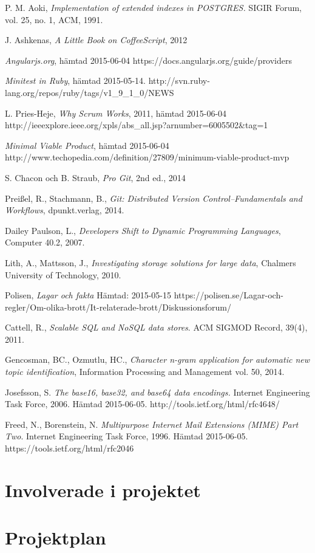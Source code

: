 \documentclass[a4paper,12pt,oneside,final]{extbook}
\begin{document}
\begin{thebibliography}{99}
  P. M. Aoki, \emph{Implementation of extended indexes in POSTGRES.} SIGIR Forum, vol. 25, no. 1, ACM, 1991.

  J. Ashkenas, \emph{A Little Book on CoffeeScript}, 2012

    \emph{Angularjs.org}, hämtad 2015-06-04
    \newline https://docs.angularjs.org/guide/providers

  \emph{Minitest in Ruby}, hämtad 2015-05-14.
  \newline http://svn.ruby-lang.org/repos/ruby/tags/v1\_9\_1\_0/NEWS

  L. Pries-Heje, \emph{Why Scrum Works}, 2011, hämtad 2015-06-04
  \newline http://ieeexplore.ieee.org/xpls/abs\_all.jsp?arnumber=6005502\&tag=1

  \emph{Minimal Viable Product}, hämtad 2015-06-04
  \newline http://www.techopedia.com/definition/27809/minimum-viable-product-mvp

  S. Chacon och B. Straub, \emph{Pro Git}, 2nd ed., 2014

  Preißel, R., Stachmann, B., \emph{Git: Distributed Version Control--Fundamentals and Workflows}, dpunkt.verlag, 2014.

  Dailey Paulson, L., \emph{Developers Shift to Dynamic Programming Languages}, Computer 40.2, 2007.

  Lith, A., Mattsson, J., \emph{Investigating storage solutions for large data}, Chalmers University of Technology, 2010.

  Polisen, \emph{Lagar och fakta} Hämtad: 2015-05-15
  \newline https://polisen.se/Lagar-och-regler/Om-olika-brott/It-relaterade-brott/Diskussionsforum/

  Cattell, R., \emph{Scalable SQL and NoSQL data stores}. ACM SIGMOD Record, 39(4), 2011.

  Gencosman, BC., Ozmutlu, HC., \emph{Character n-gram application for automatic new topic identification},
  Information Processing and Management vol. 50, 2014.

  Josefsson, S. \emph{The base16, base32, and base64 data encodings.}
  Internet Engineering Task Force, 2006. Hämtad 2015-06-05. http://tools.ietf.org/html/rfc4648/

  Freed, N., Borenstein, N.
  \emph{Multipurpose Internet Mail Extensions (MIME) Part Two}.
  Internet Engineering Task Force, 1996. Hämtad 2015-06-05.  https://tools.ietf.org/html/rfc2046

\end{thebibliography}


\appendix

\chapter{Involverade i projektet}
\chapter{Projektplan}

\end{document}
